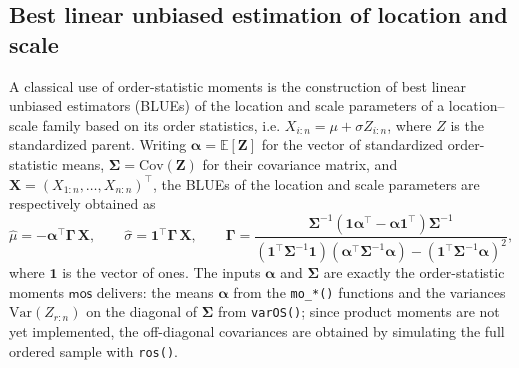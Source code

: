 \documentclass[twoside]{article}
\begin{document}
\subsection{Best linear unbiased estimation of location and scale}
\label{sec:app-blue}
A classical use of order-statistic moments is the construction of best linear
unbiased estimators (BLUEs) of the location and scale parameters of a
location--scale family based on its order statistics, i.e.   $X_{i:n}=\mu+\sigma Z_{i:n}$, where $Z$ is the standardized
parent. Writing $\boldsymbol\alpha=\mathbb{E}[\mathbf Z]$ for the vector of
standardized order-statistic means, $\boldsymbol\Sigma=\mathrm{Cov}(\mathbf Z)$ for
their covariance matrix, and $\mathbf X=(X_{1:n},\ldots,X_{n:n})^{\!\top}$, the
BLUEs of the location and scale parameters are respectively obtained as \citep{Lloyd1952, BalakrishnanLi2008}
\begin{equation}\label{eq:blue}
  \hat\mu = -\boldsymbol\alpha^{\!\top}\boldsymbol\Gamma\,\mathbf X,
  \qquad
  \hat\sigma = \mathbf 1^{\!\top}\boldsymbol\Gamma\,\mathbf X,
  \qquad
  \boldsymbol\Gamma=
  \frac{\boldsymbol\Sigma^{-1}
  (\mathbf 1\boldsymbol\alpha^{\!\top}-\boldsymbol\alpha\mathbf 1^{\!\top})
  \boldsymbol\Sigma^{-1}}
  {(\mathbf 1^{\!\top}\boldsymbol\Sigma^{-1}\mathbf 1)
   (\boldsymbol\alpha^{\!\top}\boldsymbol\Sigma^{-1}\boldsymbol\alpha)
   -(\mathbf 1^{\!\top}\boldsymbol\Sigma^{-1}\boldsymbol\alpha)^{2}},
\end{equation}
where $\mathbf 1$ is the vector of ones. The inputs $\boldsymbol\alpha$ and
$\boldsymbol\Sigma$ are exactly the order-statistic moments $\mathsf{mos}$ delivers:
the means $\boldsymbol\alpha$ from the \texttt{mo\_*()} functions and the variances
$\mathrm{Var}(Z_{r:n})$ on the diagonal of $\boldsymbol\Sigma$ from
\texttt{varOS()}; since product moments are not yet implemented, the off-diagonal
covariances are obtained by simulating the full ordered sample with
\texttt{ros()}.
\end{document}

